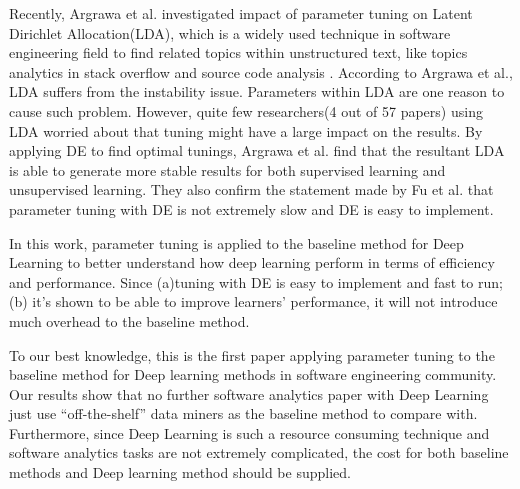 Recently, Argrawa et al.\cite{agrawal2016wrong} investigated 
impact of parameter tuning on Latent Dirichlet Allocation(LDA),
which is a widely used technique in software engineering field
to find related topics within unstructured text, 
like topics analytics in stack overflow \cite{barua2014developers}
and source code analysis \cite{binkley2014understanding}.
According to Argrawa et al., LDA suffers from the instability issue.
Parameters within LDA are one reason to cause such problem. However,
quite few researchers(4 out of 57 papers) using LDA worried about
that tuning might have a large impact on the results. By applying DE to find 
optimal tunings,  Argrawa et al. find that the resultant LDA is able to generate more stable results
for both supervised learning and unsupervised learning.
They also confirm the statement made by Fu et al.\cite{fu2016tuning} that
parameter tuning with DE is not extremely slow and DE is easy to implement.

In this work, parameter tuning is applied to the baseline method for Deep Learning
to better understand how deep learning perform in terms of efficiency and performance.
Since (a)tuning with DE is easy to implement and fast to run; (b) it's shown to be able
to improve learners' performance, it will not introduce much overhead to the baseline method.

To our best knowledge, this is the first paper
applying parameter tuning to the baseline method for Deep learning methods in 
software engineering community. Our results show that no further software analytics
paper with Deep Learning just use ``off-the-shelf'' data miners as the baseline
method to compare with. Furthermore, since Deep Learning is such a resource consuming
technique and software analytics tasks are not extremely complicated, the cost for 
both baseline methods and Deep learning method should be supplied.











